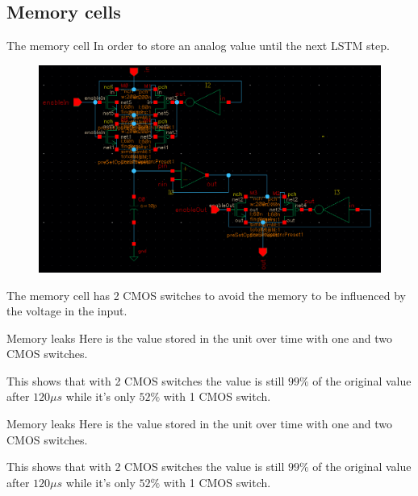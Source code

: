 \documentclass{beamer}
\newcommand{\includepgf}[3]{\resizebox{#1}{#2}{}}
\begin{document}
\subsection{Memory cells}
\begin{frame}{The memory cell}
    In order to store an analog value until the next LSTM step.
    \begin{figure}    
        \centering
        \includegraphics[height=0.5\textheight]{figures/memcell-circuit.png}
    \end{figure}
    The memory cell has 2 CMOS switches to avoid the memory to be influenced by the voltage in the input.
\end{frame}
\begin{frame}{Memory leaks}
    Here is the value stored in the unit over time with one and two CMOS switches.
    \begin{figure}
        \centering
        \resizebox{!}{0.4\textheight}{}
    \end{figure}
    This shows that with 2 CMOS switches the value is still $99\%$ of the original value after $120 \mu s$ while it's only $52\%$ with 1 CMOS switch. 
\end{frame}
\begin{frame}{Memory leaks}
    Here is the value stored in the unit over time with one and two CMOS switches.
    \begin{figure}
        \centering
        \includepgf{!}{.4\textheight}{figures/memcell-graph.pgf}
    \end{figure}
    This shows that with 2 CMOS switches the value is still $99\%$ of the original value after $120 \mu s$ while it's only $52\%$ with 1 CMOS switch. 
\end{frame}
\end{document}
